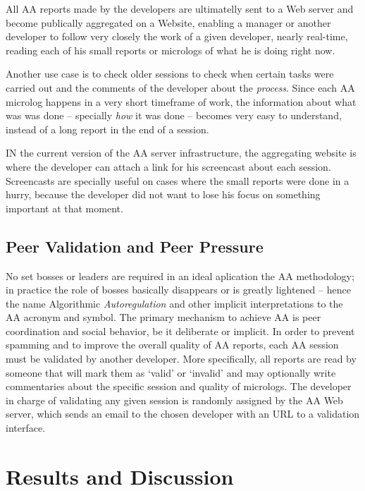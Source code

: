 \documentclass[letterpaper]{article}
\begin{document}
All AA reports made by the developers are ultimatelly sent to a Web server and
become publically aggregated on a Website, enabling a manager or another
developer to follow very closely the work of a given developer, nearly real-time,
reading each of his small reports or micrologs of what he is doing right now.

Another use case is to check older sessions to check when certain tasks
were carried out and the comments of the developer about the \emph{process}.
Since each AA microlog happens in a very short timeframe of work, the information
about what was was done -- specially \emph{how} it was done -- becomes very easy to
understand, instead of a long report in the end of a session.

IN the current version of the AA server infrastructure, the aggregating
website is where the developer can attach a link for his
screencast about each session. Screencasts are specially useful on cases where
the small reports were done in a hurry, because the developer did not want to
lose his focus on something important at that moment.

\subsection{Peer Validation and Peer Pressure}

No set bosses or leaders are required in an ideal aplication the AA methodology;
in practice the role of bosses basically disappears or is greatly lightened --
hence the name Algorithmic \emph{Autoregulation} and other implicit
interpretations to the AA acronym and symbol. The primary mechanism to achieve
AA is peer coordination and social behavior, be it deliberate or implicit. In
order to prevent spamming and to improve the overall quality of AA reports, each
AA session must be validated by another developer. More specifically, all
reports are read by someone that will mark them as `valid' or `invalid' and may
optionally write commentaries about the specific session and quality of
micrologs. The developer in charge of validating any given session is randomly
assigned by the AA Web server, which sends an email to the chosen developer with
an URL to a validation interface. 


\section{Results and Discussion}
\label{results}
\end{document}
